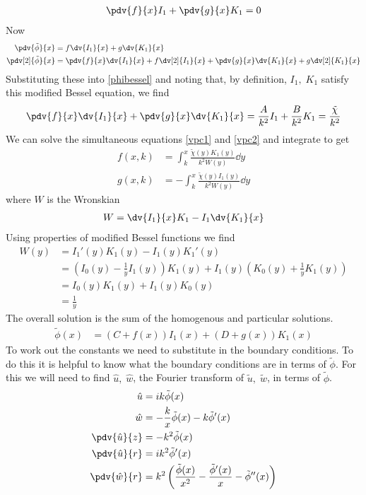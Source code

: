 \documentclass[12pt]{article}
\begin{document}
\begin{align}
\pdv{f}{x}I_1+\pdv{g}{x}K_1=0\label{vpc1}
\end{align}
Now
\begin{align}
\pdv{\tilde\phi}{x}&=f\dv{I_1}{x}+g\dv{K_1}{x}\\\pdv[2]{\tilde\phi}{x}&=\pdv{f}{x}\dv{I_1}{x}+f\dv[2]{I_1}{x}+\pdv{g}{x}\dv{K_1}{x}+g\dv[2]{K_1}{x}
\end{align}
Substituting these into \eqref{phibessel} and noting that, by definition, $I_1,\;K_1$ satisfy this modified Bessel equation, we find
\begin{align}
\pdv{f}{x}\dv{I_1}{x}+\pdv{g}{x}\dv{K_1}{x}=\frac{A}{k^2}I_1+\frac{B}{k^2}K_1=\frac{\tilde\chi}{k^2}\label{vpc2}
\end{align}
We can solve the simultaneous equations \eqref{vpc1} and \eqref{vpc2} and integrate to get
\begin{align}
f(x,k)&=\int_k^x{\frac{\tilde\chi(y)K_1(y)}{k^2W(y)}\dd{y}}\\
 g(x,k)&=-\int_k^x{\frac{\tilde\chi(y)I_1(y)}{k^2W(y)}\dd{y}}
\end{align}
where $W$ is the Wronskian
\begin{align}
W=\dv{I_1}{x}K_1-I_1\dv{K_1}{x}
\end{align}
Using properties of modified Bessel functions we find
\begin{align}
W(y)&=I_1'(y)K_1(y)-I_1(y)K_1'(y)\\
&=\left(I_0(y)-\frac{1}{y}I_1(y)\right)K_1(y)+I_1(y)\left(K_0(y)+\frac{1}{y}K_1(y)\right)\\
&=I_0(y)K_1(y)+I_1(y)K_0(y)\\&=\frac{1}{y}
\end{align}
The overall solution is the sum of the homogenous and particular solutions.
\begin{align}
\tilde\phi(x)&=(C+f(x))I_1(x)+(D+g(x))K_1(x)
\end{align}
To work out the constants we need to substitute in the boundary conditions. To do this it is helpful to know what the boundary conditions are in terms of $\tilde\phi$. For this we will need to find $\hat u,\;  \hat w$, the Fourier transform of $\tilde u,\;  \tilde w$, in terms of $\tilde\phi$.
\begin{align}
\hat u%
&=ik\tilde\phi(x)\\
\hat w%
&=-\frac{k}{x}\tilde\phi(x)-k\tilde\phi'(x)
\\\pdv{\hat u}{z}&=-k^2\tilde\phi(x)\\
\pdv{\hat u}{r}&=ik^2\tilde\phi'(x)\\
\pdv{\hat w}{r}&=k^2\left(\frac{\tilde\phi(x)}{x^2}-\frac{\tilde\phi'(x)}{x}-\tilde\phi''(x)\right)
\end{align}
\end{document}
